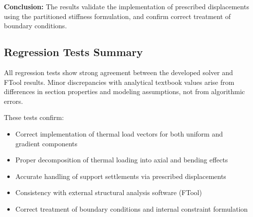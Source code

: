 \textbf{Conclusion:}  
The results validate the implementation of prescribed displacements using the partitioned stiffness formulation, and confirm correct treatment of boundary conditions.

\vspace{0.5cm}

\subsection{Regression Tests Summary}

All regression tests show strong agreement between the developed solver and FTool results. Minor discrepancies with analytical textbook values arise from differences in section properties and modeling assumptions, not from algorithmic errors.

These tests confirm:
\begin{itemize}
    \item Correct implementation of thermal load vectors for both uniform and gradient components
    \item Proper decomposition of thermal loading into axial and bending effects
    \item Accurate handling of support settlements via prescribed displacements
    \item Consistency with external structural analysis software (FTool)
    \item Correct treatment of boundary conditions and internal constraint formulation
\end{itemize}
